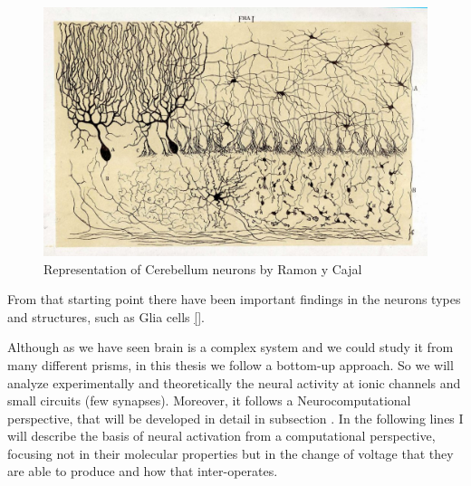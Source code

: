 \begin{figure}[htb!]
    \centering
    \includegraphics[width=\textwidth]{img/intro/CajalCerebellum.jpeg}
    \caption{Representation of Cerebellum neurons by Ramon y Cajal}
    \label{cajal-neuron}
\end{figure}

From that starting point there have been important findings in the neurons types and structures, such as Glia cells \ref{}. 

Although as we have seen brain is a complex system and we could study it from many different prisms, in this thesis we follow a bottom-up approach. So we will analyze experimentally and theoretically the neural activity at ionic channels and small circuits (few synapses). Moreover, it follows a Neurocomputational perspective, that will be developed in detail in subsection \label{computational neuroscience}. In the following lines I will describe the basis of neural activation from a computational perspective, focusing not in their molecular properties but in the change of voltage that they are able to produce and how that inter-operates. 

